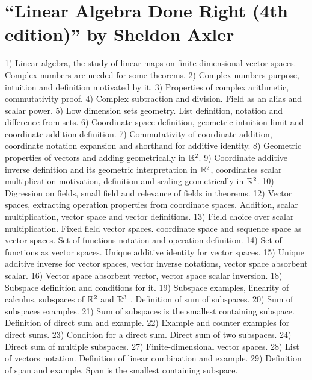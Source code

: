 

\usepackage[english]{babel}


\section*{``Linear Algebra Done Right (4th edition)'' by Sheldon Axler}
\begin{multicols}{3}
  1) Linear algebra, the study of linear maps on finite-dimensional vector
  spaces. Complex numbers are needed for some theorems.
  2) Complex numbers purpose, intuition and definition motivated by it.
  3) Properties of complex arithmetic, commutativity proof.
  4) Complex subtraction and division. Field as an alias and scalar power.
  5) Low dimension sets geometry. List definition, notation and difference from
  sets.
  6) Coordinate space definition, geometric intuition limit and coordinate
  addition definition.
  7) Commutativity of coordinate addition, coordinate notation expansion and
  shorthand for additive identity.
  8) Geometric properties of vectors and adding geometrically in $\mathbb{R}^2$.
  9) Coordinate additive inverse definition and its geometric interpretation in
  $\mathbb{R}^2$, coordinates scalar multiplication motivation, definition and
  scaling geometrically in $\mathbb{R}^2$.
  10) Digression on fields, small field and relevance of fields in theorems.
  12) Vector spaces, extracting operation properties from coordinate spaces.
  Addition, scalar multiplication, vector space and vector definitions.
  13) Field choice over scalar multiplication. Fixed field vector spaces.
  coordinate space and sequence space as vector spaces. Set of functions notation
  and operation definition.
  14) Set of functions as vector spaces. Unique additive identity for vector
  spaces.
  15) Unique additive inverse for vector spaces, vector inverse notations,
  vector space absorbent scalar.
  16) Vector space absorbent vector, vector space scalar inversion.
  18) Subspace definition and conditions for it.
  19) Subspace examples, linearity of calculus, subspaces of $\mathbb{R}^2$ and
  $\mathbb{R}^3$ . Definition of sum of subspaces.
  20) Sum of subspaces examples.
  21) Sum of subspaces is the smallest containing subspace. Definition of direct
  sum and example.
  22) Example and counter examples for direct sums.
  23) Condition for a direct sum. Direct sum of two subspaces.
  24) Direct sum of multiple subspaces.
  27) Finite-dimensional vector spaces.
  28) List of vectors notation. Definition of linear combination and example.
  29) Definition of span and example. Span is the smallest containing subspace.

\end{multicols}
